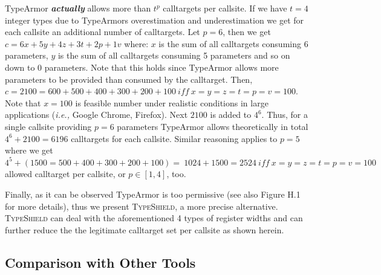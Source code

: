 TypeArmor \textbf{\textit{actually}} allows more than $t^{p}$ calltargets per callsite. If we have $t=4$ integer types due to TypeArmors overestimation
and underestimation we get for each callsite an additional number of calltargets. Let $p=6$, then we get $c = 6x + 5y+ 4z + 3t + 2p + 1v$ where:
$x$ is the sum of all calltargets consuming 6 parameters, 
$y$ is the sum of all calltargets consuming 5 parameters 
and so on down to 0 parameters. Note that this holds since TypeArmor allows more parameters to be provided than consumed by the calltarget.
Then, $c = 2100 = 600 + 500 + 400 + 300 + 200 + 100 \ iff \ x = y = z = t = p = v = 100$. 
Note that $x = 100$ is feasible number under realistic conditions in large applications (\textit{i.e.,} Google Chrome, Firefox). 
Next $2100$ is added to $4^{6}$. Thus, for a single callsite providing $p=6$ parameters TypeArmor allows theoretically in 
total $4^{6} + 2100 = 6196$ calltargets for each callsite.
Similar reasoning applies to $p=5$ where we get $4^{5} + (1500 = 500 + 400 + 300 + 200 + 100) = \ 1024 + 1500 = 2524 \ iff \ x=y=z=t=p=v=100$ 
allowed calltarget per callsite, or $p \in [1, 4]$, too.

Finally, as it can be observed TypeArmor is too permissive (see also Figure H.1~\cite{vci:asiaccs} for more details), thus 
we present \textsc{TypeShield}, a more precise alternative. \textsc{TypeShield} can deal with the aforementioned 4 types of register widths and can further reduce the the legitimate
calltarget set per callsite as shown herein.

\subsection{Comparison with Other Tools}
\label{RQ5: Is TypeShield better than other tools?}

\texttt{}

